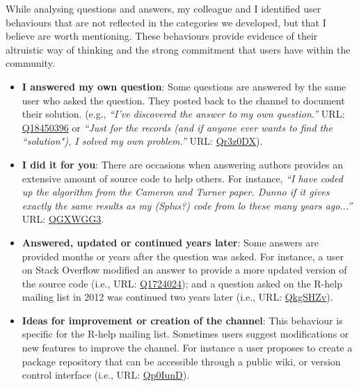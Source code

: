 \documentclass{sig-alternate-05-2015}
\begin{document}
	While analysing questions and answers, my colleague and I identified user behaviours that are not reflected in the categories we developed, but that I believe are worth mentioning.
	These behaviours provide evidence of their altruistic way of thinking and the strong commitment that users have within the community.
	\begin{itemize}
		\item \textbf{I answered my own question}: Some questions are answered by the same user who asked the question. They posted back to the channel to document their solution.
		(e.g., \textit{``I've discovered the answer to my own question.''} {\footnotesize URL:  \href{http://goo.gl/FG59Mw}{Q18450396}} or \textit{``Just for the records (and if anyone ever wants to find the ``solution"), I solved my own problem.''} {\footnotesize URL:  \href{https://goo.gl/r3z0DX}{Qr3z0DX}}).

		\item \textbf{I did it for you}: There are occasions when answering authors provides an extensive amount of source code to help others. For instance, \textit{``I have coded up the algorithm from the Cameron and Turner paper. Dunno if it gives exactly the same results as my (Splus?) code from lo these many years ago...''} {\footnotesize URL:  \href{http://goo.gl/GXWGG3}{QGXWGG3}}.

		\item \textbf{Answered, updated or continued years later}: Some answers are provided months or years after the question was asked.
		For instance, a user on Stack Overflow modified an answer to provide a more updated version of the source code (i.e., {\footnotesize URL:  \href{http://goo.gl/k6ZARR}{Q1724024}}); and a question asked on the R-help mailing list in 2012 was continued two years later (i.e., {\footnotesize URL:  \href{http://goo.gl/kgSHZv}{QkgSHZv}}).

		\item \textbf{Ideas for improvement or creation of the channel}: This behaviour is specific for the R-help mailing list. Sometimes users suggest modifications or new features to improve the channel. For instance a user proposes to create a package repository that can be accessible through a public wiki, or version control interface (i.e., {\footnotesize URL:  \href{http://goo.gl/p0IunD}{Qp0IunD}}).
	\end{itemize}
\end{document}
